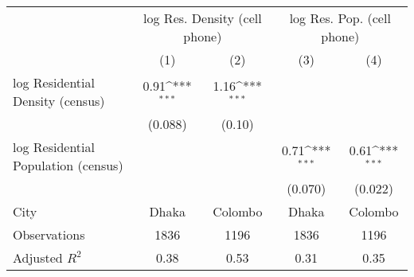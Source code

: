 {
\def\sym#1{\ifmmode^{#1}\else\(^{#1}\)\fi}
\begin{tabular}{l*{4}{c}}
\toprule
                    &\multicolumn{2}{c}{log Res. Density (cell phone)}&\multicolumn{2}{c}{log Res. Pop. (cell phone)}\\\cmidrule(lr){2-3}\cmidrule(lr){4-5}
                    &\multicolumn{1}{c}{(1)}         &\multicolumn{1}{c}{(2)}         &\multicolumn{1}{c}{(3)}         &\multicolumn{1}{c}{(4)}         \\
\midrule
log Residential Density (census)&        0.91\sym{***}&        1.16\sym{***}&                     &                     \\
                    &     (0.088)         &      (0.10)         &                     &                     \\
\addlinespace
log Residential Population (census)&                     &                     &        0.71\sym{***}&        0.61\sym{***}\\
                    &                     &                     &     (0.070)         &     (0.022)         \\
\midrule
City                &       Dhaka         &     Colombo         &       Dhaka         &     Colombo         \\
Observations        &        1836         &        1196         &        1836         &        1196         \\
Adjusted $ R^2$     &        0.38         &        0.53         &        0.31         &        0.35         \\
\bottomrule
\end{tabular}
}
